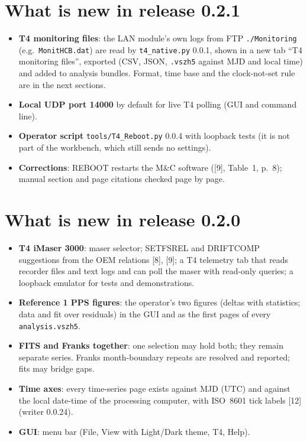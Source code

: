 \documentclass[11pt,a4paper]{article}
\newcommand{\tfourman}{[8]}
\newcommand{\tfournet}{[9]}
\begin{document}
\section{What is new in release 0.2.1}
\begin{itemize}
\item \textbf{T4 monitoring files}: the LAN module's own logs from FTP \texttt{./Monitoring}
(e.g.\ \texttt{MonitHCB.dat}) are read by \texttt{t4\_native.py} 0.0.1, shown in a new tab
``T4 monitoring files'', exported (CSV, JSON, \texttt{.vszh5} against MJD and local time) and
added to analysis bundles. Format, time base and the clock-not-set rule are in the next sections.
\item \textbf{Local UDP port 14000} by default for live T4 polling (GUI and command line).
\item \textbf{Operator script} \texttt{tools/T4\_Reboot.py} 0.0.4 with loopback tests (it is not
part of the workbench, which still sends no settings).
\item \textbf{Corrections}: REBOOT restarts the M\&C software (\tfournet, Table~1, p.~8); manual
section and page citations checked page by page.
\end{itemize}

\section{What is new in release 0.2.0}
\begin{itemize}
\item \textbf{T4 iMaser 3000}: maser selector; SETFSREL and DRIFTCOMP suggestions from the
OEM relations \tfourman, \tfournet; a T4 telemetry tab that reads recorder files and text logs
and can poll the maser with read-only queries; a loopback emulator for tests and demonstrations.
\item \textbf{Reference 1 PPS figures}: the operator's two figures (deltas with statistics;
data and fit over residuals) in the GUI and as the first pages of every \texttt{analysis.vszh5}.
\item \textbf{FITS and Franks together}: one selection may hold both; they remain separate
series. Franks month-boundary repeats are resolved and reported; fits may bridge gaps.
\item \textbf{Time axes}: every time-series page exists against MJD (UTC) and against the
local date-time of the processing computer, with ISO~8601 tick labels [12]
(writer 0.0.24).
\item \textbf{GUI}: menu bar (File, View with Light/Dark theme, T4, Help).
\end{itemize}
\end{document}
